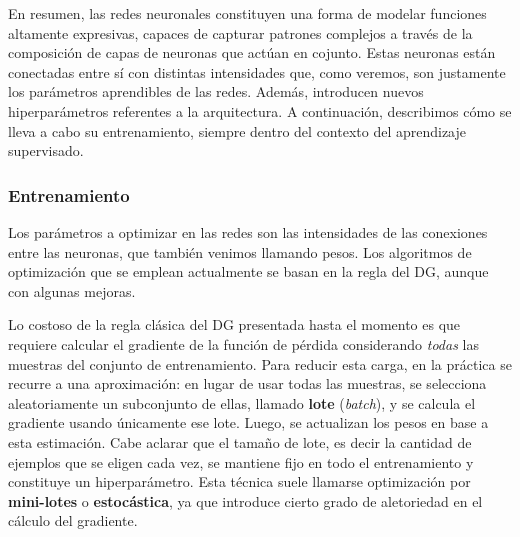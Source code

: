 \documentclass[../../main.tex]{subfiles}
\begin{document}

\bigskip
En resumen, las redes neuronales constituyen una forma de modelar funciones altamente
expresivas, capaces de capturar patrones complejos a través de la composición de capas de
neuronas que actúan en cojunto. Estas neuronas están conectadas entre sí con distintas
intensidades que, como veremos, son justamente los parámetros aprendibles de las redes.
Además, introducen nuevos hiperparámetros referentes a la arquitectura. A continuación,
describimos cómo se lleva a cabo su entrenamiento, siempre dentro del contexto del
aprendizaje supervisado.

\subsubsection{Entrenamiento}
Los parámetros a optimizar en las redes son las intensidades de las conexiones entre las
neuronas, que también venimos llamando pesos. Los algoritmos de optimización que se
emplean actualmente se basan en la regla del DG, aunque con algunas mejoras.

Lo costoso de la regla clásica del DG presentada hasta el momento es que requiere calcular
el gradiente de la función de pérdida considerando \textit{todas} las muestras del
conjunto de entrenamiento. Para reducir esta carga, en la práctica se recurre a una
aproximación: en lugar de usar todas las muestras, se selecciona aleatoriamente un
subconjunto de ellas, llamado \textbf{lote} (\textit{batch}), y se calcula el gradiente
usando únicamente ese lote. Luego, se actualizan los pesos en base a esta estimación. Cabe
aclarar que el tamaño de lote, es decir la cantidad de ejemplos que se eligen cada vez, se
mantiene fijo en todo el entrenamiento y constituye un hiperparámetro. Esta técnica suele
llamarse optimización por \textbf{mini-lotes} o \textbf{estocástica}, ya que introduce
cierto grado de aletoriedad en el cálculo del gradiente.
\end{document}
